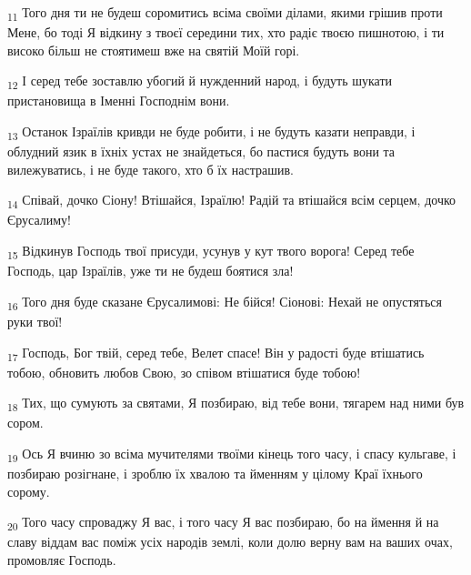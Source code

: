 \begin{tcolorbox}
\textsubscript{11} Того дня ти не будеш соромитись всіма своїми ділами, якими грішив проти Мене, бо тоді Я відкину з твоєї середини тих, хто радіє твоєю пишнотою, і ти високо більш не стоятимеш вже на святій Моїй горі.
\end{tcolorbox}
\begin{tcolorbox}
\textsubscript{12} І серед тебе зоставлю убогий й нужденний народ, і будуть шукати пристановища в Іменні Господнім вони.
\end{tcolorbox}
\begin{tcolorbox}
\textsubscript{13} Останок Ізраїлів кривди не буде робити, і не будуть казати неправди, і облудний язик в їхніх устах не знайдеться, бо пастися будуть вони та вилежуватись, і не буде такого, хто б їх настрашив.
\end{tcolorbox}
\begin{tcolorbox}
\textsubscript{14} Співай, дочко Сіону! Втішайся, Ізраїлю! Радій та втішайся всім серцем, дочко Єрусалиму!
\end{tcolorbox}
\begin{tcolorbox}
\textsubscript{15} Відкинув Господь твої присуди, усунув у кут твого ворога! Серед тебе Господь, цар Ізраїлів, уже ти не будеш боятися зла!
\end{tcolorbox}
\begin{tcolorbox}
\textsubscript{16} Того дня буде сказане Єрусалимові: Не бійся! Сіонові: Нехай не опустяться руки твої!
\end{tcolorbox}
\begin{tcolorbox}
\textsubscript{17} Господь, Бог твій, серед тебе, Велет спасе! Він у радості буде втішатись тобою, обновить любов Свою, зо співом втішатися буде тобою!
\end{tcolorbox}
\begin{tcolorbox}
\textsubscript{18} Тих, що сумують за святами, Я позбираю, від тебе вони, тягарем над ними був сором.
\end{tcolorbox}
\begin{tcolorbox}
\textsubscript{19} Ось Я вчиню зо всіма мучителями твоїми кінець того часу, і спасу кульгаве, і позбираю розігнане, і зроблю їх хвалою та йменням у цілому Краї їхнього сорому.
\end{tcolorbox}
\begin{tcolorbox}
\textsubscript{20} Того часу спроваджу Я вас, і того часу Я вас позбираю, бо на ймення й на славу віддам вас поміж усіх народів землі, коли долю верну вам на ваших очах, промовляє Господь.
\end{tcolorbox}
